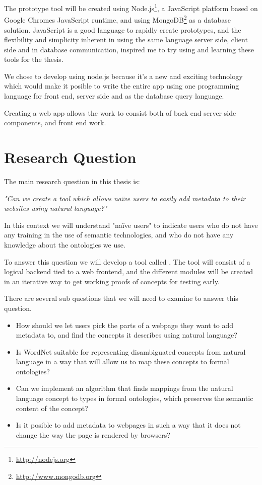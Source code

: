 The prototype tool will be created using Node.js\footnote{\url{http://nodejs.org}},
a JavaScript platform based on Google Chromes JavaScript runtime,
and using MongoDB\footnote{\url{http://www.mongodb.org}} as a database solution.
JavaScript is a good language to rapidly create prototypes, and the flexibility and simplicity inherent in using the same language
server side, client side and in database communication, inspired me to try using and learning these tools for the thesis.

%

We chose to develop using node.js because it's a new and exciting technology which would make it posible to write
the entire app using one programming language for front end, server side and as the database query language.

Creating a web app allows the work to consist both of back end server side components, and front end work.


\section{Research Question}
The main research question in this thesis is:

\emph{"Can we create a tool which allows naïve users to easily add metadata to their websites using natural language?"}

In this context we will understand "naïve users" to indicate users who do not have any training in the use of semantic technologies,
and who do not have any knowledge about the ontologies we use.

To answer this question we will develop a tool called \theartefact.
The tool will consist of a logical backend tied to a web frontend,
and the different modules will be created in an iterative way to get working proofs of concepts for testing early.

There are several sub questions that we will need to examine to answer this question.
\begin{itemize}
	\item How should we let users pick the parts of a webpage they want to add metadata to,
and find the concepts it describes using natural language?
	\item Is WordNet suitable for representing disambiguated concepts from natural language in a way that will allow us to map these concepts to formal ontologies?
	\item Can we implement an algorithm that finds mappings from the natural language concept to types in
			formal ontologies, which preserves the semantic content of the concept?
	\item Is it posible to add metadata to webpages in such a way that it does not change the way the page is rendered by browsers?
\end{itemize}

